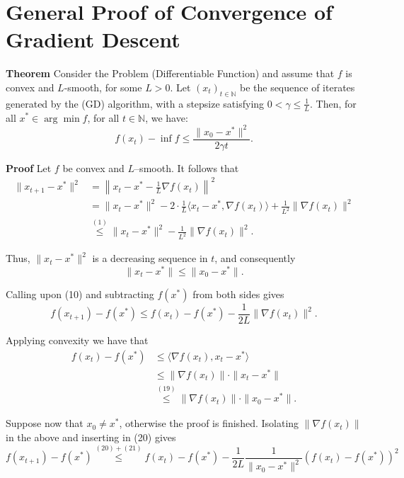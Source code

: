\documentclass{article}
\begin{document}
\section*{General Proof of Convergence of Gradient Descent}

\textbf{Theorem} Consider the Problem (Differentiable Function) and assume that \( f \) is convex
and \( L \)-smooth, for some \( L > 0 \). Let \( (x_t)_{t\in\mathbb{N}} \) be the sequence of iterates generated by the (GD)
algorithm, with a stepsize satisfying \( 0 < \gamma \le \frac{1}{L} \). Then, for all \( x^* \in \arg\min f \), for all \( t \in \mathbb{N} \), we have:
\[
f(x_t) - \inf f \le \frac{\|x_0 - x^*\|^2}{2\gamma t}.
\]

\textbf{Proof} Let $f$ be convex and $L$–smooth. It follows that
\begin{align*}
\|x_{t+1} - x^*\|^2 
&= \left\|x_t - x^* - \frac{1}{L} \nabla f(x_t) \right\|^2 \\
&= \|x_t - x^*\|^2 
   - 2 \cdot \frac{1}{L} \langle x_t - x^*, \nabla f(x_t) \rangle 
   + \frac{1}{L^2} \|\nabla f(x_t)\|^2  \\
&\overset{(1)}{\le} \|x_t - x^*\|^2 - \frac{1}{L^2} \|\nabla f(x_t)\|^2. \tag{18}
\end{align*}

Thus, \( \|x_t - x^*\|^2 \) is a decreasing sequence in \( t \), and consequently
\begin{equation}
\|x_t - x^*\| \le \|x_0 - x^*\|. \tag{19}
\end{equation}

Calling upon (10) and subtracting \( f(x^*) \) from both sides gives
\begin{equation}
f(x_{t+1}) - f(x^*) \le f(x_t) - f(x^*) - \frac{1}{2L} \|\nabla f(x_t)\|^2. \tag{20}
\end{equation}

Applying convexity we have that
\begin{align}
f(x_t) - f(x^*) &\le \langle \nabla f(x_t), x_t - x^* \rangle \nonumber \\
&\le \|\nabla f(x_t)\| \cdot \|x_t - x^*\| \nonumber \\
&\overset{(19)}{\le} \|\nabla f(x_t)\| \cdot \|x_0 - x^*\|. \tag{21}
\end{align}

Suppose now that \( x_0 \neq x^* \), otherwise the proof is finished. Isolating \( \| \nabla f(x_t) \| \) in the above and inserting in (20) gives
\[
f(x_{t+1}) - f(x^*) \overset{(20) + (21)}{\leq} f(x_t) - f(x^*) - \frac{1}{2L} \frac{1}{\|x_0 - x^*\|^2} ( f(x_t) - f(x^*) )^2  \tag{22}
\]
\end{document}
